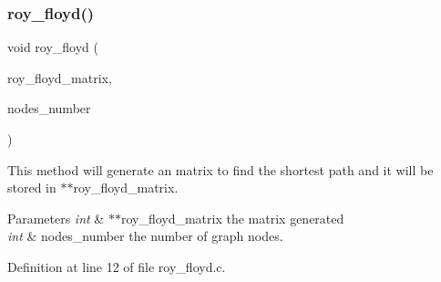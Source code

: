 \subsubsection{roy\+\_\+floyd()}
{\footnotesize\ttfamily void roy\+\_\+floyd (\begin{DoxyParamCaption}\item[{int $\ast$$\ast$}]{roy\+\_\+floyd\+\_\+matrix,  }\item[{int}]{nodes\+\_\+number }\end{DoxyParamCaption})}

This method will generate an matrix to find the shortest path and it will be stored in $\ast$$\ast$roy\+\_\+floyd\+\_\+matrix. 
\begin{DoxyParams}{Parameters}
{\em int} & $\ast$$\ast$roy\+\_\+floyd\+\_\+matrix the matrix generated \\
\hline
{\em int} & nodes\+\_\+number the number of graph nodes. \\
\hline
\end{DoxyParams}


Definition at line 12 of file roy\+\_\+floyd.\+c.


